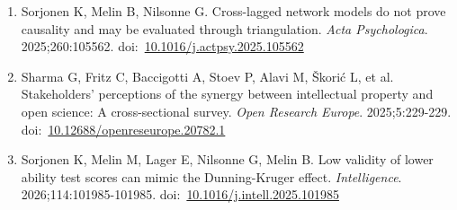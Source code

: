 \documentclass[10pt,a4paper,twocolumn]{article}
\begin{document}
\begin{enumerate}
    \item Sorjonen K, Melin B, Nilsonne G. Cross-lagged network models do not prove causality and may be evaluated through triangulation. \textit{Acta Psychologica}. 2025;260:105562. doi:~\href{https://doi.org/10.1016/j.actpsy.2025.105562}{10.1016/j.actpsy.2025.105562}

    \item Sharma G, Fritz C, Baccigotti A, Stoev P, Alavi M, Škorić L, et al. Stakeholders’ perceptions of the synergy between intellectual property and open science: A cross-sectional survey. \textit{Open Research Europe}. 2025;5:229-229. doi:~\href{https://doi.org/10.12688/openreseurope.20782.1}{10.12688/openreseurope.20782.1}

    \item Sorjonen K, Melin M, Lager E, Nilsonne G, Melin B. Low validity of lower ability test scores can mimic the Dunning-Kruger effect. \textit{Intelligence}. 2026;114:101985-101985. doi:~\href{https://doi.org/10.1016/j.intell.2025.101985}{10.1016/j.intell.2025.101985}

\end{enumerate}


\end{document}
